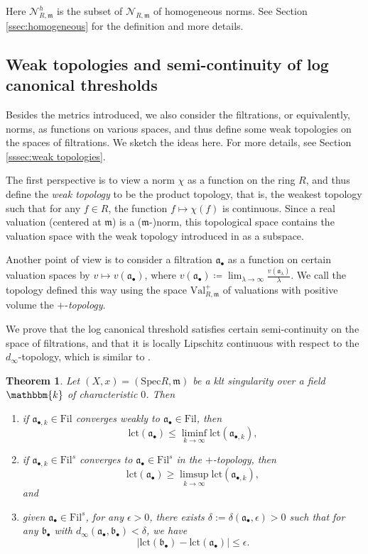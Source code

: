 \documentclass[11pt, leqno]{amsart}%
\theoremstyle{plain}
\newtheorem{theorem}{Theorem}[section]
\theoremstyle{definition}
\theoremstyle{remark}
\newcommand{\cN}{\mathcal{N}}
\newcommand{\fa}{\mathfrak{a}}
\newcommand{\fb}{\mathfrak{b}}
\newcommand{\fm}{\mathfrak{m}}
\newcommand{\lct}{\mathrm{lct}}
\newcommand{\Val}{\mathrm{Val}}
\newcommand{\Spec}{\mathrm{Spec}}
\newcommand{\bk}{\mathbbm{k}}
\newcommand{\Fil}{\mathrm{Fil}}
\numberwithin{equation}{section}
\begin{document}
Here $\cN^h_{R,\fm}$ is the subset of $\cN_{R,\fm}$ of homogeneous norms. See Section \ref{ssec:homogeneous} for the definition and more details.
	
	
\subsection{Weak topologies and semi-continuity of log canonical thresholds}\label{ssec:lct}

Besides the metrics introduced, we also consider the filtrations, or equivalently, norms, as functions on various spaces, and thus define some weak topologies on the spaces of filtrations. We sketch the ideas here. For more details, see Section \ref{sssec:weak topologies}. 

The first perspective is to view a norm $\chi$ as a function on the ring $R$, and thus define the \emph{weak topology} to be the product topology, that is, the weakest topology such that for any $f\in R$, the function $f\mapsto\chi(f)$ is continuous. Since a real valuation (centered at $\fm$) is a ($\fm$-)norm, this topological space contains the valuation space with the weak topology introduced in \cite{JM12} as a subspace. 

Another point of view is to consider a filtration $\fa_\bullet$ as a function on certain valuation spaces by $v\mapsto v(\fa_\bullet)$, where $v(\fa_\bullet)\coloneqq\lim_{\lambda\to\infty} \frac{v(\fa_\lambda)}{\lambda}$. We call the topology defined this way using the space $\Val^+_{R,\fm}$ of valuations with positive volume the $+$-\emph{topology}.
	
We prove that the log canonical threshold satisfies certain semi-continuity on the space of filtrations, and that it is locally Lipschitz continuous with respect to the $d_\infty$-topology, which is similar to \cite[Theorem 3.3]{DK01}.
	
\begin{theorem}\label{thm:lct}
    Let $(X,x)=(\Spec R,\fm)$ be a klt singularity over a field $\bk$ of characteristic $0$. Then
    \begin{enumerate}
        \item if $\fa_{\bullet,k}\in\Fil$ converges weakly to $\fa_\bullet\in\Fil$, then 
        \[
            \lct(\fa_\bullet)\le \liminf_{k\to\infty}\lct(\fa_{\bullet,k}),
        \]
			
        \item if $\fa_{\bullet,k}\in\Fil^s$ converges to $\fa_\bullet\in\Fil^s$ in the $+$-topology, then
        \[
            \lct(\fa_\bullet)\ge
            \limsup_{k\to\infty}\lct(\fa_{\bullet,k}),
        \]
        and
			
        \item given $\fa_\bullet\in\Fil^s$, for any $\epsilon>0$, there exists $\delta:=\delta(\fa_\bullet,\epsilon)>0$ such that for any $\fb_\bullet$ with $d_\infty(\fa_\bullet,\fb_\bullet)<\delta$, we have 
        \[
            |\lct(\fb_\bullet)-\lct(\fa_\bullet)|\le\epsilon.
        \]
    \end{enumerate}
\end{theorem}
	
\end{document}

